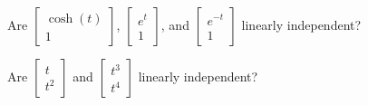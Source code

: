 \documentclass{ximera}
\begin{document}
\begin{exercise}%
    Are
    $\left[ 
        \begin{smallmatrix}
            \cosh(t) \\ 
            1
        \end{smallmatrix}
    \right]$,
    $\left[ 
        \begin{smallmatrix}
            e^{t} \\ 
            1
        \end{smallmatrix}
    \right]$,
    and
    $\left[ 
        \begin{smallmatrix}
            e^{-t} \\ 
            1
        \end{smallmatrix}
    \right]$
    linearly independent?  %
    \begin{multipleChoice}
    \end{multipleChoice}
\end{exercise}

\begin{exercise}
    Are 
    $\left[ 
        \begin{smallmatrix}
            t \\ 
            t^2
        \end{smallmatrix} 
    \right]$ and
    $\left[ 
        \begin{smallmatrix}
            t^3 \\ 
            t^4
        \end{smallmatrix} 
    \right]$ 
    linearly independent?
    \begin{multipleChoice}
    \end{multipleChoice}
\end{exercise}
\end{document}
